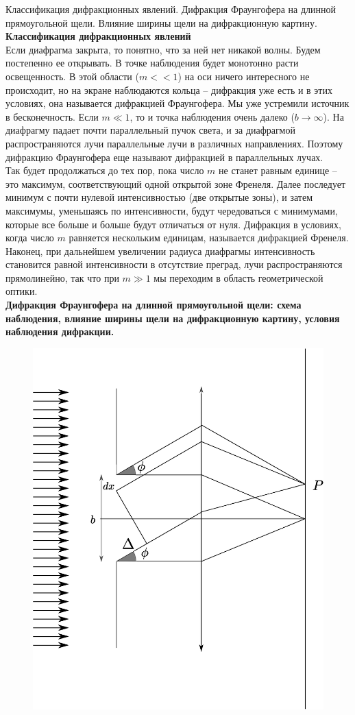 \documentclass[__main__.tex]{subfiles}
\begin{document}
Классификация дифракционных явлений. Дифракция Фраунгофера на длинной прямоугольной щели. Влияние ширины щели на дифракционную картину.\\ 


\textbf{Классификация дифракционных явлений}\\

Если диафрагма закрыта, то понятно, что за ней нет никакой волны. Будем постепенно ее открывать. В точке наблюдения будет монотонно расти освещенность. В этой области ($m << 1$) на оси ничего интересного не происходит, но на экране наблюдаются кольца -- дифракция уже есть и в этих условиях, она называется дифракцией Фраунгофера.
Мы уже устремили источник в бесконечность. Если $m\ll{1}$,
то и точка наблюдения очень далеко ($b \rightarrow \infty$). На диафрагму падает почти параллельный пучок света, и за диафрагмой распространяются лучи параллельные лучи в различных направлениях. Поэтому дифракцию Фраунгофера еще называют дифракцией в параллельных лучах.\\
Так будет продолжаться до тех пор, пока число $m$ не станет равным единице – это максимум, соответствующий одной открытой зоне Френеля. Далее последует минимум с почти нулевой интенсивностью (две открытые зоны), и затем максимумы, уменьшаясь по интенсивности, будут чередоваться с минимумами, которые все больше и больше будут отличаться от нуля. Дифракция в условиях, когда число $m$ равняется нескольким единицам, называется дифракцией Френеля.
Наконец, при дальнейшем увеличении радиуса диафрагмы интенсивность становится равной интенсивности в отсутствие преград, лучи распространяются прямолинейно, так что при $m\gg{1}$ мы переходим в область геометрической
оптики.\\

\textbf{Дифракция Фраунгофера на длинной прямоугольной щели: схема наблюдения, влияние ширины щели на дифракционную картину, условия наблюдения дифракции.}\\

\begin{figure}[h]
	\begin{center}
		\includegraphics[width=0.5\linewidth]{img/o-08_3.eps}
	\end{center}
\end{figure}
\end{document}
